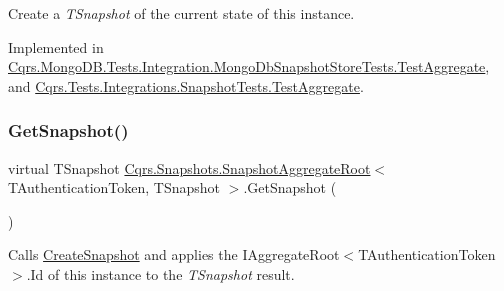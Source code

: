 Create a {\itshape T\+Snapshot}  of the current state of this instance. 



Implemented in \hyperlink{classCqrs_1_1MongoDB_1_1Tests_1_1Integration_1_1MongoDbSnapshotStoreTests_1_1TestAggregate_a1a38ed933432bc5ab1bf4b0b5ed51caa_a1a38ed933432bc5ab1bf4b0b5ed51caa}{Cqrs.\+Mongo\+D\+B.\+Tests.\+Integration.\+Mongo\+Db\+Snapshot\+Store\+Tests.\+Test\+Aggregate}, and \hyperlink{classCqrs_1_1Tests_1_1Integrations_1_1SnapshotTests_1_1TestAggregate_a3857c57a4e603c8d53103caf5f3275d3_a3857c57a4e603c8d53103caf5f3275d3}{Cqrs.\+Tests.\+Integrations.\+Snapshot\+Tests.\+Test\+Aggregate}.

\mbox{\label{classCqrs_1_1Snapshots_1_1SnapshotAggregateRoot_a30ec8fe3a09fec8238c5921c629a5ac1_a30ec8fe3a09fec8238c5921c629a5ac1}} 
\subsubsection{\texorpdfstring{Get\+Snapshot()}{GetSnapshot()}}
{\footnotesize\ttfamily virtual T\+Snapshot \hyperlink{classCqrs_1_1Snapshots_1_1SnapshotAggregateRoot}{Cqrs.\+Snapshots.\+Snapshot\+Aggregate\+Root}$<$ T\+Authentication\+Token, T\+Snapshot $>$.Get\+Snapshot (\begin{DoxyParamCaption}{ }\end{DoxyParamCaption})\hspace{0.3cm}{\ttfamily [virtual]}}



Calls \hyperlink{classCqrs_1_1Snapshots_1_1SnapshotAggregateRoot_a2d8cd57c7b6c2696d286c6dc5e9f0479_a2d8cd57c7b6c2696d286c6dc5e9f0479}{Create\+Snapshot} and applies the I\+Aggregate\+Root$<$\+T\+Authentication\+Token$>$.\+Id of this instance to the {\itshape T\+Snapshot}  result. 

\mbox{\label{classCqrs_1_1Snapshots_1_1SnapshotAggregateRoot_a0b39f2941c828d987c84dc6cbb0a02be_a0b39f2941c828d987c84dc6cbb0a02be}} 
